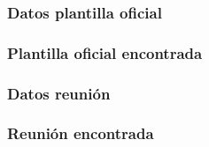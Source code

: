   

  \subsubsection{Datos plantilla oficial}

  

  \subsubsection{Plantilla oficial encontrada}

  

  \subsubsection{Datos reunión}

  

  \subsubsection{Reunión encontrada}

  
